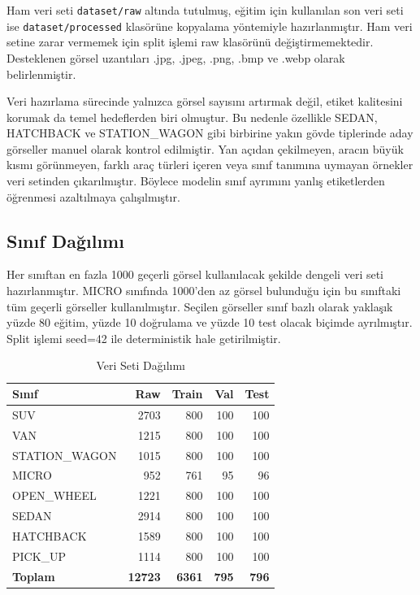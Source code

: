 \documentclass[conference]{IEEEtran}
\begin{document}
Ham veri seti \texttt{dataset/raw} altında tutulmuş, eğitim için kullanılan
son veri seti ise \texttt{dataset/processed} klasörüne kopyalama yöntemiyle
hazırlanmıştır. Ham veri setine zarar vermemek için split işlemi raw
klasörünü değiştirmemektedir. Desteklenen görsel uzantıları .jpg, .jpeg,
.png, .bmp ve .webp olarak belirlenmiştir.
\vspace{0.4cm}

Veri hazırlama sürecinde yalnızca görsel sayısını artırmak değil, etiket
kalitesini korumak da temel hedeflerden biri olmuştur. Bu nedenle özellikle
SEDAN, HATCHBACK ve STATION\_WAGON gibi birbirine yakın gövde tiplerinde
aday görseller manuel olarak kontrol edilmiştir. Yan açıdan çekilmeyen,
aracın büyük kısmı görünmeyen, farklı araç türleri içeren veya sınıf
tanımına uymayan örnekler veri setinden çıkarılmıştır. Böylece modelin
sınıf ayrımını yanlış etiketlerden öğrenmesi azaltılmaya çalışılmıştır.

\subsection{Sınıf Dağılımı}

Her sınıftan en fazla 1000 geçerli görsel kullanılacak şekilde dengeli
veri seti hazırlanmıştır. MICRO sınıfında 1000'den az görsel bulunduğu
için bu sınıftaki tüm geçerli görseller kullanılmıştır. Seçilen görseller
sınıf bazlı olarak yaklaşık yüzde 80 eğitim, yüzde 10 doğrulama ve yüzde
10 test olacak biçimde ayrılmıştır. Split işlemi seed=42 ile deterministik
hale getirilmiştir.

\begin{table}[H]
\centering
\caption{Veri Seti Dağılımı}
\label{tab:dataset_distribution}
\small
\begin{tabular}{|l|r|r|r|r|}
\hline
\textbf{Sınıf} & \textbf{Raw} & \textbf{Train} & \textbf{Val} & \textbf{Test} \\
\hline
SUV & 2703 & 800 & 100 & 100 \\
VAN & 1215 & 800 & 100 & 100 \\
STATION\_WAGON & 1015 & 800 & 100 & 100 \\
MICRO & 952 & 761 & 95 & 96 \\
OPEN\_WHEEL & 1221 & 800 & 100 & 100 \\
SEDAN & 2914 & 800 & 100 & 100 \\
HATCHBACK & 1589 & 800 & 100 & 100 \\
PICK\_UP & 1114 & 800 & 100 & 100 \\
\hline
\textbf{Toplam} & \textbf{12723} & \textbf{6361} & \textbf{795} & \textbf{796} \\
\hline
\end{tabular}
\end{table}
\end{document}
